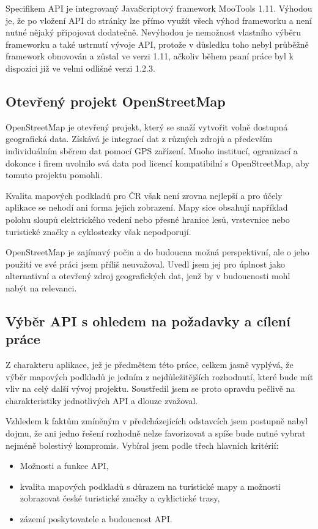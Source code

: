 Specifikem API je integrovaný JavaScriptový framework MooTools 1.11.
Výhodou je, že po vložení API do stránky lze přímo využít všech výhod
frameworku a není nutné nějaký připojovat dodatečně. Nevýhodou je
nemožnost vlastního výběru frameworku a také ustrnutí vývoje API,
protože v důsledku toho nebyl průběžně framework obnovován a zůstal
ve verzi 1.11, ačkoliv během psaní práce byl k dispozici již ve velmi
odlišné verzi 1.2.3.

\subsection{Otevřený projekt OpenStreetMap}
OpenStreetMap je otevřený projekt, který se snaží vytvořit volně
dostupná geografická data. Získává je integrací dat z různých zdrojů
a především individuálním sběrem dat pomocí GPS zařízení. Mnoho
institucí, ogranizací a dokonce i firem uvolnilo svá data pod licencí
kompatibilní s OpenStreetMap, aby tomuto projektu pomohli.

Kvalita mapových podkladů pro ČR však není zrovna nejlepší a
pro účely aplikace se nehodí ani forma jejich zobrazení. Mapy sice
obsahují například polohu sloupů elektrického vedení nebo přesné
hranice lesů, vrstevnice nebo turistické značky a cyklostezky však
nepodporují.

OpenStreetMap je zajímavý počin a do budoucna možná perspektivní, ale
o jeho použití ve své práci jsem příliš neuvažoval. Uvedl jsem jej
pro úplnost jako alternativní a otevřený zdroj geografických dat,
jenž by v budoucnosti mohl nabýt na relevanci.

\subsection{Výběr API s ohledem na požadavky a cílení práce}
Z charakteru aplikace, jež je předmětem této práce, celkem jasně
vyplývá, že výběr mapových podkladů je jedním z nejdůležitějších
rozhodnutí, které bude mít vliv na celý další vývoj projektu.
Soustředil jsem se proto opravdu pečlivě na charakteristiky
jednotlivých API a dlouze zvažoval.

Vzhledem k faktům zmíněným v předcházejících odstavcích jsem
postupně nabyl dojmu, že ani jedno řešení rozhodně nelze favorizovat a
spíše bude nutné vybrat nejméně bolestivý kompromis. Vybíral jsem
podle třech hlavních kritérií:
\begin{itemize}
	\item Možnosti a funkce API,
	\item kvalita mapových podkladů s důrazem na turistické
	mapy a možnosti zobrazovat české turistické značky a cyklictické
	trasy,
	\item zázemí poskytovatele a budoucnost API.
\end{itemize}

